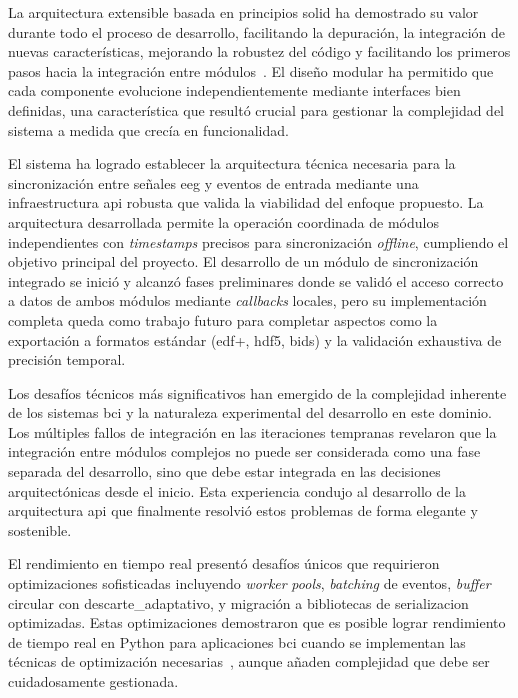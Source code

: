 La arquitectura extensible basada en principios \acrshort{solid} ha demostrado su valor durante todo el proceso de desarrollo, facilitando la depuración, la integración de nuevas características, mejorando la robustez del código y facilitando los primeros pasos hacia la integración entre módulos~\cite{martin2003agile}. El diseño modular ha permitido que cada componente evolucione independientemente mediante interfaces bien definidas, una característica que resultó crucial para gestionar la complejidad del sistema a medida que crecía en funcionalidad.

El sistema ha logrado establecer la arquitectura técnica necesaria para la sincronización entre señales \acrshort{eeg} y eventos de entrada mediante una infraestructura \acrshort{api} robusta que valida la viabilidad del enfoque propuesto. La arquitectura desarrollada permite la operación coordinada de módulos independientes con \textit{\glspl{timestamp}} precisos para sincronización \textit{offline}, cumpliendo el objetivo principal del proyecto. El desarrollo de un módulo de sincronización integrado se inició y alcanzó fases preliminares donde se validó el acceso correcto a datos de ambos módulos mediante \textit{\glspl{callback}} locales, pero su implementación completa queda como trabajo futuro para completar aspectos como la exportación a formatos estándar (\acrshort{edf+}, \acrshort{hdf5}, \acrshort{bids}) y la validación exhaustiva de precisión temporal.

Los desafíos técnicos más significativos han emergido de la complejidad inherente de los sistemas \acrshort{bci} y la naturaleza experimental del desarrollo en este dominio. Los múltiples fallos de integración en las iteraciones tempranas revelaron que la integración entre módulos complejos no puede ser considerada como una fase separada del desarrollo, sino que debe estar integrada en las decisiones arquitectónicas desde el inicio. Esta experiencia condujo al desarrollo de la arquitectura \acrshort{api} que finalmente resolvió estos problemas de forma elegante y sostenible.

El rendimiento en tiempo real presentó desafíos únicos que requirieron optimizaciones sofisticadas incluyendo \textit{\gls{worker}} \textit{pools}, \textit{\gls{batching}} de eventos, \textit{\gls{buffer}} circular con \gls{descarte_adaptativo}, y migración a bibliotecas de \gls{serializacion} optimizadas. Estas optimizaciones demostraron que es posible lograr rendimiento de tiempo real en Python para aplicaciones \acrshort{bci} cuando se implementan las técnicas de optimización necesarias~\cite{Rakhmatulin2021}, aunque añaden complejidad que debe ser cuidadosamente gestionada.

